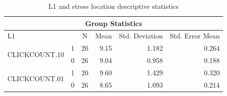 \documentclass[a4paper]{article}
\begin{document}
\begin{table}[H]
\centering
\caption{L1 and stress location descriptive statistics}
\label{tab:descriptivecross}
\begin{tabular}{|l|l|r|r|r|r|} 
\hline
\multicolumn{6}{|c|}{Group Statistics}                                                                                                                                \\ 
\hline
L1                             &   & \multicolumn{1}{c|}{N} & \multicolumn{1}{c|}{Mean} & \multicolumn{1}{c|}{Std. Deviation} & \multicolumn{1}{c|}{Std. Error Mean}  \\ 
\hline
\multirow{2}{*}{CLICKCOUNT.10} & 1 & 20                     & 9.15                      & 1.182                               & 0.264                                 \\ 
\cline{2-6}
                               & 0 & 26                     & 9.04                      & 0.958                               & 0.188                                 \\ 
\hline
\multirow{2}{*}{CLICKCOUNT.01} & 1 & 20                     & 9.60                      & 1.429                               & 0.320                                 \\ 
\cline{2-6}
                               & 0 & 26                     & 8.65                      & 1.093                               & 0.214                                 \\
\hline
\end{tabular}
\end{table}
\end{document}
